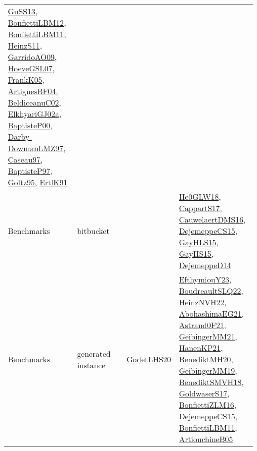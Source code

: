 {\begin{longtable}{lp{3cm}>{\raggedright}p{6cm}>{\raggedright}p{6cm}p{8cm}}
\href{papers/GuSS13.pdf}{GuSS13}\cite{GuSS13}, \href{papers/BonfiettiLBM12.pdf}{BonfiettiLBM12}\cite{BonfiettiLBM12}, \href{papers/BonfiettiLBM11.pdf}{BonfiettiLBM11}\cite{BonfiettiLBM11}, \href{papers/HeinzS11.pdf}{HeinzS11}\cite{HeinzS11}, \href{articles/GarridoAO09.pdf}{GarridoAO09}\cite{GarridoAO09}, \href{papers/HoeveGSL07.pdf}{HoeveGSL07}\cite{HoeveGSL07}, \href{papers/FrankK05.pdf}{FrankK05}\cite{FrankK05}, \href{papers/ArtiguesBF04.pdf}{ArtiguesBF04}\cite{ArtiguesBF04}, \href{papers/BeldiceanuC02.pdf}{BeldiceanuC02}\cite{BeldiceanuC02}, \href{papers/ElkhyariGJ02a.pdf}{ElkhyariGJ02a}\cite{ElkhyariGJ02a}, \href{articles/BaptisteP00.pdf}{BaptisteP00}\cite{BaptisteP00}, \href{articles/Darby-DowmanLMZ97.pdf}{Darby-DowmanLMZ97}\cite{Darby-DowmanLMZ97}, \href{papers/Caseau97.pdf}{Caseau97}\cite{Caseau97}, \href{papers/BaptisteP97.pdf}{BaptisteP97}\cite{BaptisteP97}, \href{papers/Goltz95.pdf}{Goltz95}\cite{Goltz95}, \href{papers/ErtlK91.pdf}{ErtlK91}\cite{ErtlK91}\\
Benchmarks & bitbucket &  &  & \href{papers/He0GLW18.pdf}{He0GLW18}\cite{He0GLW18}, \href{papers/CappartS17.pdf}{CappartS17}\cite{CappartS17}, \href{papers/CauwelaertDMS16.pdf}{CauwelaertDMS16}\cite{CauwelaertDMS16}, \href{papers/DejemeppeCS15.pdf}{DejemeppeCS15}\cite{DejemeppeCS15}, \href{papers/GayHLS15.pdf}{GayHLS15}\cite{GayHLS15}, \href{papers/GayHS15.pdf}{GayHS15}\cite{GayHS15}, \href{papers/DejemeppeD14.pdf}{DejemeppeD14}\cite{DejemeppeD14}\\
Benchmarks & generated instance &  & \href{papers/GodetLHS20.pdf}{GodetLHS20}\cite{GodetLHS20} & \href{papers/EfthymiouY23.pdf}{EfthymiouY23}\cite{EfthymiouY23}, \href{papers/BoudreaultSLQ22.pdf}{BoudreaultSLQ22}\cite{BoudreaultSLQ22}, \href{articles/HeinzNVH22.pdf}{HeinzNVH22}\cite{HeinzNVH22}, \href{articles/AbohashimaEG21.pdf}{AbohashimaEG21}\cite{AbohashimaEG21}, \href{papers/Astrand0F21.pdf}{Astrand0F21}\cite{Astrand0F21}, \href{papers/GeibingerMM21.pdf}{GeibingerMM21}\cite{GeibingerMM21}, \href{papers/HanenKP21.pdf}{HanenKP21}\cite{HanenKP21}, \href{articles/BenediktMH20.pdf}{BenediktMH20}\cite{BenediktMH20}, \href{papers/GeibingerMM19.pdf}{GeibingerMM19}\cite{GeibingerMM19}, \href{papers/BenediktSMVH18.pdf}{BenediktSMVH18}\cite{BenediktSMVH18}, \href{papers/GoldwaserS17.pdf}{GoldwaserS17}\cite{GoldwaserS17}, \href{papers/BonfiettiZLM16.pdf}{BonfiettiZLM16}\cite{BonfiettiZLM16}, \href{papers/DejemeppeCS15.pdf}{DejemeppeCS15}\cite{DejemeppeCS15}, \href{papers/BonfiettiLBM11.pdf}{BonfiettiLBM11}\cite{BonfiettiLBM11}, \href{papers/ArtiouchineB05.pdf}{ArtiouchineB05}\cite{ArtiouchineB05}\\

\end{longtable}}
